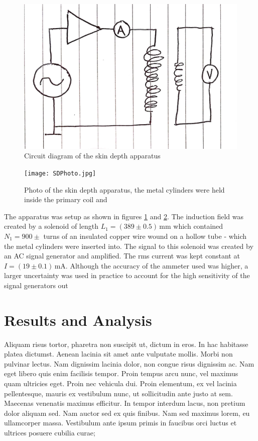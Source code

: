 \documentclass[a4paper,12pt,twocolumn]{article}
\begin{document}
	\begin{figure}
		\centering
		\includegraphics[scale=0.1]{SDcircuit.jpg}
		\captionsetup{font=scriptsize}
		\caption{Circuit diagram of the skin depth apparatus}
		\label{fig:circuit}
	\end{figure}

	\begin{figure}
		\centering
		\texttt{[image: SDPhoto.jpg]}
		\captionsetup{font=scriptsize}
		\caption{Photo of the skin depth apparatus, the metal cylinders were held inside the primary coil and  }
		\label{fig:photo}
	\end{figure}

	The apparatus was setup as shown in figures \ref{fig:circuit} and \ref{fig:photo}. The induction field was created by a solenoid of length $L_1 = (389 \pm 0.5) \,\text{mm}$ which contained $N_1 = 900 \pm $ turns of an insulated copper wire wound on a hollow tube - which the metal cylinders were inserted into. The signal to this solenoid was created by an AC signal generator and amplified. The rms current was kept constant at $I = (19 \pm 0.1)\,\text{mA}$. Although the accuracy of the ammeter used was higher, a larger uncertainty was used in practice to account for the high sensitivity of the signal generators out 
	
\section{Results and Analysis}
	Aliquam risus tortor, pharetra non suscipit ut, dictum in eros. In hac habitasse platea dictumst. Aenean lacinia sit amet ante vulputate mollis. Morbi non pulvinar lectus. Nam dignissim lacinia dolor, non congue risus dignissim ac. Nam eget libero quis enim facilisis tempor. Proin tempus arcu nunc, vel maximus quam ultricies eget. Proin nec vehicula dui. Proin elementum, ex vel lacinia pellentesque, mauris ex vestibulum nunc, ut sollicitudin ante justo at sem. Maecenas venenatis maximus efficitur. In tempor interdum lacus, non pretium dolor aliquam sed. Nam auctor sed ex quis finibus. Nam sed maximus lorem, eu ullamcorper massa. Vestibulum ante ipsum primis in faucibus orci luctus et ultrices posuere cubilia curae;
	
\end{document}
